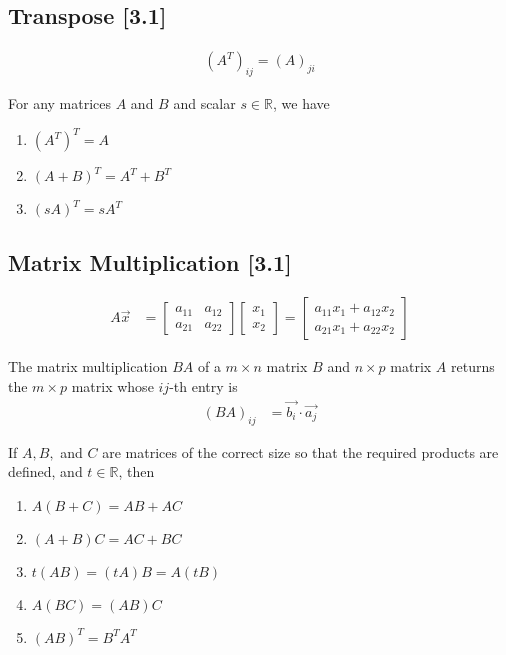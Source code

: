 \documentclass[a4paper,9pt]{extarticle}
\begin{document}
\begin{multicols*}{2}
\subsection{Transpose [3.1]}
\begin{equation} \label{3.1-3}
    \begin{split}
        (A^T)_{ij} = (A)_{ji}
    \end{split}
\end{equation}

For any matrices $A$ and $B$ and scalar $s \in \mathbb{R}$, we have
\begin{enumerate}[label=\bfseries (\arabic*)] \itemsep0pt \parskip0pt 
    \item $(A^T)^T = A$
    \item $(A + B)^T = A^T + B^T$
    \item $(s A)^T = s A^T$
\end{enumerate}


\subsection{Matrix Multiplication [3.1]}
\begin{equation} \label{3.1-4}
    \begin{split}
        A \vec{x} & = \begin{bmatrix}a_{11} & a_{12} \\ a_{21} & a_{22}\end{bmatrix} \begin{bmatrix}x_1 \\ x_2\end{bmatrix} = \begin{bmatrix}a_{11} x_1 + a_{12} x_2 \\ a_{21} x_1 + a_{22} x_2\end{bmatrix}
    \end{split}
\end{equation}

The matrix multiplication $BA$ of a $m \times n$ matrix $B$ and $n \times p$ matrix $A$ returns the $m \times p$ matrix whose $ij$-th entry is
\begin{equation} \label{3.1-5}
    \begin{split}
        (BA)_{ij} & = \vec{b_i} \cdot \vec{a_j}
    \end{split}
\end{equation}

If $A, B,$ and $C$ are matrices of the correct size so that the required products are defined, and $t \in \mathbb{R}$, then
\begin{enumerate}[label=\bfseries (\arabic*)] \itemsep0pt \parskip0pt 
    \item $A(B + C) = AB + AC$
    \item $(A + B)C = AC + BC$
    \item $t(AB) = (tA)B = A(tB)$
    \item $A(BC) = (AB)C$
    \item $(AB)^T = B^TA^T$
\end{enumerate}


\end{multicols*}
\end{document}
